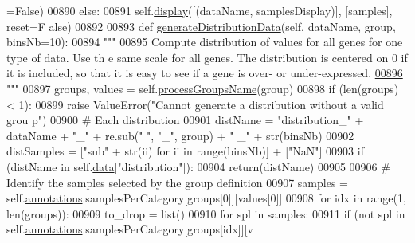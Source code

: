 \begin{DoxyCode}
      =\textcolor{keyword}{False})
00890                 \textcolor{keywordflow}{else}:
00891                     self.\hyperlink{classnavicom_1_1navicom_1_1NaviCom_ad7d4390d700d4a6d2533647887f8ab94}{display}([(dataName, samplesDisplay)], [samples], reset=\textcolor{keyword}{F
      alse})
00892 
00893     \textcolor{keyword}{def }\hyperlink{classnavicom_1_1navicom_1_1NaviCom_a8d417589ac7fb5ab3c26ccd025938504}{generateDistributionData}(self, dataName, group, binsNb=10):
00894         \textcolor{stringliteral}{"""}
00895 \textcolor{stringliteral}{        Compute distribution of values for all genes for one type of data. Use th
      e same scale for all genes. The distribution is centered on 0 if it is included, 
      so that it is easy to see if a gene is over- or under-expressed.}
\hypertarget{navicom_8py_source_l00896}{}\hyperlink{classnavicom_1_1navicom_1_1NaviCom_a8d417589ac7fb5ab3c26ccd025938504}{00896} \textcolor{stringliteral}{        """}
00897         groups, values = self.\hyperlink{classnavicom_1_1navicom_1_1NaviCom_af04ea16f3ccb0d883f5b01471c0c1a6f}{processGroupsName}(group)
00898         \textcolor{keywordflow}{if} (len(groups) < 1):
00899             \textcolor{keywordflow}{raise} ValueError(\textcolor{stringliteral}{"Cannot generate a distribution without a valid grou
      p"})
00900         \textcolor{comment}{# Each distribution }
00901         distName = \textcolor{stringliteral}{"distribution\_"} + dataName + \textcolor{stringliteral}{"\_"} + re.sub(\textcolor{stringliteral}{" "}, \textcolor{stringliteral}{"\_"}, group) + \textcolor{stringliteral}{"
      \_"} + str(binsNb)
00902         distSamples = [\textcolor{stringliteral}{"sub"} + str(ii) \textcolor{keywordflow}{for} ii \textcolor{keywordflow}{in} range(binsNb)] + [\textcolor{stringliteral}{"NaN"}]
00903         \textcolor{keywordflow}{if} (distName \textcolor{keywordflow}{in} self.\hyperlink{classnavicom_1_1navicom_1_1NaviCom_aa1abff245573ed8406c6bddb4596f093}{data}[\textcolor{stringliteral}{"distribution"}]):
00904             \textcolor{keywordflow}{return}(distName)
00905 
00906         \textcolor{comment}{# Identify the samples selected by the group definition}
00907         samples = self.\hyperlink{classnavicom_1_1navicom_1_1NaviCom_a0386d881214943cf3432d0ffe22cbb71}{annotations}.samplesPerCategory[groups[0]][values[0]]
00908         \textcolor{keywordflow}{for} idx \textcolor{keywordflow}{in} range(1, len(groups)):
00909             to\_drop = list()
00910             \textcolor{keywordflow}{for} spl \textcolor{keywordflow}{in} samples:
00911                 \textcolor{keywordflow}{if} (\textcolor{keywordflow}{not} spl \textcolor{keywordflow}{in} self.\hyperlink{classnavicom_1_1navicom_1_1NaviCom_a0386d881214943cf3432d0ffe22cbb71}{annotations}.samplesPerCategory[groups[idx]][v

\end{DoxyCode}
